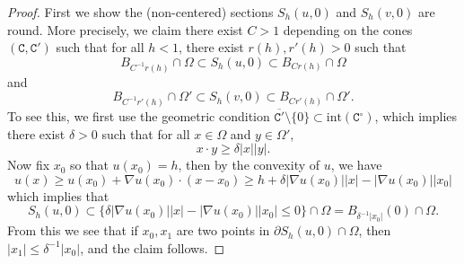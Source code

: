 \documentclass[12pt,reqno]{amsart}
\numberwithin{equation}{section}
\begin{document}
        \begin{proof}
            First we show the (non-centered) sections $S_h(u, 0)$ and $S_h(v, 0)$ are round. More precisely, we claim there exist $C>1$ depending on the cones $(\mathtt C, \mathtt C')$ such that for all $h<1$, there exist $r(h), r'(h)>0$ such that
            \[B_{C^{-1}r(h)}\cap\Omega\subset S_h(u, 0)\subset B_{Cr(h)}\cap\Omega\]
            and 
            \[B_{C^{-1}r'(h)}\cap\Omega'\subset S_h(v, 0)\subset B_{Cr'(h)}\cap\Omega'. \]
            To see this, we first use the geometric condition $\overline{\mathtt C'}\setminus \{0\}\subset \text{int}(\mathtt C^{\circ})$, which implies there exist $\delta>0$ such that for all $x\in \Omega$ and $y\in \Omega'$,
            \[x\cdot y\geq \delta|x||y|.\]
            Now fix $x_0$ so that $u(x_0) = h$, then by the convexity of $u$, we have
            \[u(x)\geq u(x_0)+\nabla u(x_0)\cdot (x-x_0)\geq h+\delta|\nabla u(x_0)||x|-|\nabla u(x_0)||x_0|\]
            which implies that \[S_h(u, 0)\subset \{\delta|\nabla u(x_0)||x|-|\nabla u(x_0)||x_0|\leq 0\}\cap\Omega = B_{\delta^{-1}|x_0|}(0)\cap \Omega.\] 
            From this we see that if $x_0, x_1$ are two points in $\partial S_h(u, 0)\cap\Omega$, then $|x_1|\leq \delta^{-1}|x_0|$, and the claim follows. 


\end{proof}
\end{document}
